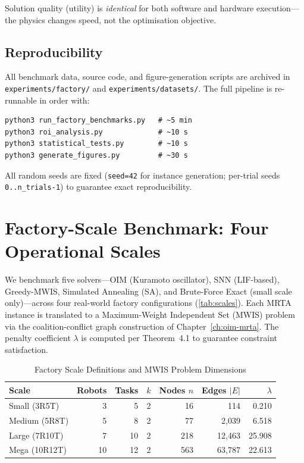 Solution quality (utility) is \emph{identical} for both software and hardware
execution—the physics changes speed, not the optimisation objective.

\subsection*{Reproducibility}

All benchmark data, source code, and figure-generation scripts are archived in
\texttt{experiments/factory/} and \texttt{experiments/datasets/}.  The full
pipeline is re-runnable in order with:

\begin{verbatim}
python3 run_factory_benchmarks.py   # ~5 min
python3 roi_analysis.py             # ~10 s
python3 statistical_tests.py        # ~10 s
python3 generate_figures.py         # ~30 s
\end{verbatim}

All random seeds are fixed (\texttt{seed=42} for instance generation;
per-trial seeds \texttt{0..n\_trials-1}) to guarantee exact reproducibility.

\section{Factory-Scale Benchmark: Four Operational Scales}
\label{sec:factory_benchmarks}

We benchmark five solvers—OIM (Kuramoto oscillator), SNN (LIF-based),
Greedy-MWIS, Simulated Annealing (SA), and Brute-Force Exact (small scale
only)—across four real-world factory configurations
(\autoref{tab:scales}).  Each MRTA instance is translated to a
Maximum-Weight Independent Set (MWIS) problem via the coalition-conflict graph
construction of Chapter~\ref{ch:oim-mrta}.  The penalty coefficient $\lambda$
is computed per Theorem~4.1 to guarantee constraint satisfaction.

\begin{table}[!htpb]
\caption{Factory Scale Definitions and MWIS Problem Dimensions}
\label{tab:scales}
\centering
\begin{tabular}{lrrrrrr}
\toprule
\textbf{Scale} & \textbf{Robots} & \textbf{Tasks} & \textbf{$k$} &
  \textbf{Nodes $n$} & \textbf{Edges $|E|$} & \textbf{$\lambda$} \\
\midrule
Small  (3R5T)  &  3 &  5 & 2 &   16 &    114 & 0.210 \\
Medium (5R8T)  &  5 &  8 & 2 &   77 &  2,039 & 6.518 \\
Large  (7R10T) &  7 & 10 & 2 &  218 & 12,463 & 25.908 \\
Mega   (10R12T)& 10 & 12 & 2 &  563 & 63,787 & 22.613 \\
\bottomrule
\end{tabular}
\end{table}

